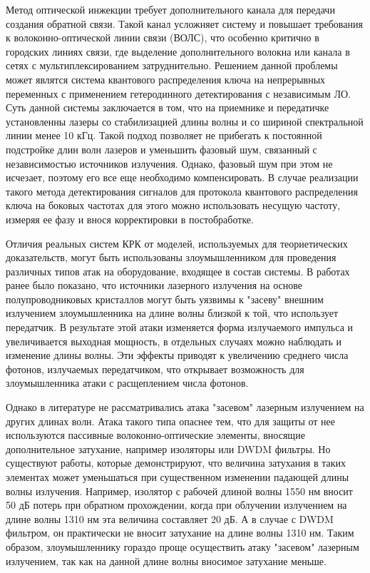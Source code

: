 Метод оптической инжекции требует дополнительного канала для передачи создания обратной связи. Такой канал усложняет систему и повышает требования к волоконно-оптической линии связи (ВОЛС), что особенно критично в городских линиях связи, где выделение дополнительного волокна или канала в сетях с мультиплексированием затруднительно. Решением данной проблемы может являтся система квантового распределения ключа на непрерывных переменных с применением гетеродинного детектирования с независимым ЛО. Суть данной системы заключается в том, что на приемнике и передатичке установленны лазеры со стабилизацией длины волны и со шириной спектральной линии менее 10 кГц. Такой подход позволяет не прибегать к постоянной подстройке длин волн лазеров и уменьшить фазовый шум, связанный с независимостью источников излучения.
Однако, фазовый шум при этом не исчезает, поэтому его все еще необходимо компенсировать. В случае реализации такого метода детектирования сигналов для протокола квантового распределения ключа на боковых частотах для этого можно использовать несущую частоту, измеряя ее фазу и внося корректировки в постобработке. 

Отличия реальных систем КРК от  моделей, используемых для теориетических доказательств, могут быть использованы злоумышленником для проведения различных типов атак на оборудование, входящее в состав системы. В работах ранее было показано, что источники лазерного излучения на основе полупроводниковых кристаллов могут быть уязвимы к "засеву" внешним излучением злоумышленника на длине волны близкой к той, что использует передатчик. В результате этой атаки изменяется форма излучаемого импульса и увеличивается выходная мощность, в отдельных случаях можно наблюдать и изменение длины волны. Эти эффекты приводят к увеличению среднего числа фотонов, излучаемых передатчиком, что открывает возможность для злоумышленника атаки с расщеплением числа фотонов. 

Однако в литературе не рассматривались атака "засевом" лазерным излучением на других длинах волн. Атака такого типа опаснее тем, что для защиты от нее используются пассивные волоконно-оптические элементы, вносящие дополнительное затухание, например изоляторы или DWDM фильтры. Но существуют работы, которые демонстрируют, что величина затухания в таких элементах может уменьшаться при существенном изменении падающей длины волны излучения. Например, изолятор с рабочей длиной волны 1550 нм вносит 50 дБ потерь при обратном прохождении, когда при облучении излучением на длине волны 1310 нм эта величина составляет 20 дБ. А в случае с DWDM фильтром, он практически не вносит затухание на длине волны 1310 нм. Таким образом, злоумышленнику гораздо проще осуществить атаку "засевом" лазерным излучением, так как на данной длине волны вносимое затухание меньше. 

